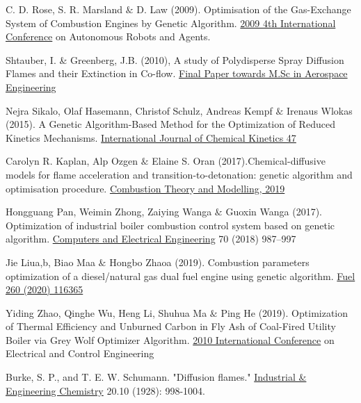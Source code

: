 \documentclass[12pt]{article}
\numberwithin{equation}{section}
\begin{document}
\begin{flushleft}
\begin{thebibliography}{9}
 \label{ga3}
C. D. Rose, S. R. Marsland $\&$ D. Law (2009). Optimisation of the Gas-Exchange System of Combustion Engines by Genetic Algorithm. \href{https://ieeexplore.ieee.org/document/4804021}{2009 4th International Conference} on Autonomous Robots and Agents.


 \label{ga33}
Shtauber, I. \& Greenberg, J.B. (2010), A study of Polydisperse Spray Diffusion Flames and their Extinction in Co-flow. \href{http://www.graduate.technion.ac.il/Theses/Abstracts.asp?Id=24930}{Final Paper towards M.Sc in Aerospace Engineering}


 \label{f1}
Nejra Sikalo, Olaf Hasemann, Christof Schulz, Andreas Kempf $\&$ Irenaus Wlokas (2015). A Genetic Algorithm-Based Method for the Optimization of Reduced Kinetics Mechanisms. \href{https://www.researchgate.net/publication/282270904_A_Genetic_Algorithm-Based_Method_for_the_Optimization_of_Reduced_Kinetics_Mechanisms}{International Journal of Chemical Kinetics 47}


 \label{f2}
Carolyn R. Kaplan, Alp Ozgen $\&$ Elaine S. Oran (2017).Chemical-diffusive models for flame acceleration and
transition-to-detonation: genetic algorithm and optimisation procedure. \href{https://arxiv.org/abs/1709.00096}{Combustion Theory and Modelling, 2019}


 \label{ga4}
Hongguang Pan, Weimin Zhong, Zaiying Wanga $\&$ Guoxin Wanga (2017). Optimization of industrial boiler combustion control system based on genetic algorithm. \href{https://www.sciencedirect.com/science/article/pii/S0045790617325302?via%3Dihub}{Computers and Electrical Engineering} 70 (2018) 987–997


 \label{ga5}
Jie Liua,b, Biao Maa $\&$ Hongbo Zhaoa (2019). Combustion parameters optimization of a diesel/natural gas dual fuel engine using genetic algorithm. \href{https://www.sciencedirect.com/science/article/pii/S0016236119317193?via%3Dihub}{Fuel 260 (2020) 116365}


 \label{ga7}
Yiding Zhao, Qinghe Wu, Heng Li, Shuhua Ma $\&$ Ping He (2019). Optimization of Thermal Efficiency and Unburned Carbon in Fly Ash of Coal-Fired Utility Boiler via Grey Wolf Optimizer Algorithm. \href{https://ieeexplore.ieee.org/document/4804021}{2010 International Conference} on Electrical and Control Engineering

 \label{ga8}
Burke, S. P., and T. E. W. Schumann. "Diffusion flames." \href{https://pubs.acs.org/doi/pdf/10.1021/ie50226a005}{Industrial \& Engineering Chemistry} 20.10 (1928): 998-1004.



\end{thebibliography}
\end{flushleft}
\end{document}
